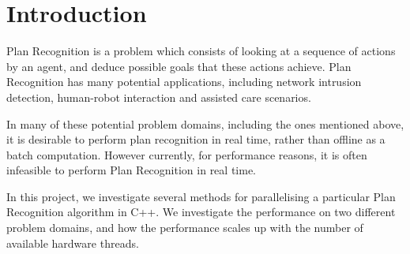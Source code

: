 \chapter{Introduction}

Plan Recognition is a problem which consists of looking at a sequence of actions by an agent, and deduce possible goals that these actions achieve. Plan Recognition has many potential applications, including network intrusion detection, human-robot interaction and assisted care scenarios.

In many of these potential problem domains, including the ones mentioned above, it is desirable to perform plan recognition in real time, rather than offline as a batch computation. However currently, for performance reasons, it is often infeasible to perform Plan Recognition in real time.

In this project, we investigate several methods for parallelising a particular Plan Recognition algorithm in C++. We investigate the performance on two different problem domains, and how the performance scales up with the number of available hardware threads.


